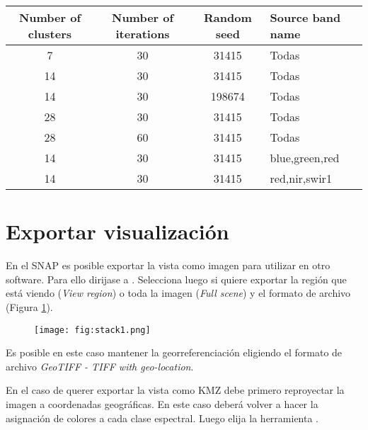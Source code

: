 \begin{table}[h]
\centering
\begin{tabular}{cccl}
\toprule
Number of clusters & Number of iterations & Random seed & Source band name \\ \midrule
7                  & 30                   & 31415       & Todas            \\
14                 & 30                   & 31415       & Todas            \\
14                 & 30                   & 198674      & Todas            \\
28                 & 30                   & 31415       & Todas            \\
28                 & 60                   & 31415       & Todas            \\
14                 & 30                   & 31415       & blue,green,red   \\
14                 & 30                   & 31415       & red,nir,swir1    \\ \bottomrule
\end{tabular}
\end{table}

\section{Exportar visualización}

En el SNAP es posible exportar la vista como imagen para utilizar en otro software. Para ello dirijase a . Selecciona luego si quiere exportar la región que está viendo (\emph{View region}) o toda la imagen (\emph{Full scene}) y el formato de archivo (Figura \ref{fig:vista}).

\begin{figure}[h!]
    \centering
    \texttt{[image: fig:stack1.png]}
    \caption{}
    \label{fig:vista}
\end{figure}

Es posible en este caso mantener la georreferenciación eligiendo el formato de archivo \emph{GeoTIFF - TIFF with geo-location}.

En el caso de querer exportar la vista como KMZ debe primero reproyectar la imagen a coordenadas geográficas. En este caso deberá volver a hacer la asignación de colores a cada clase espectral. Luego elija la herramienta .
